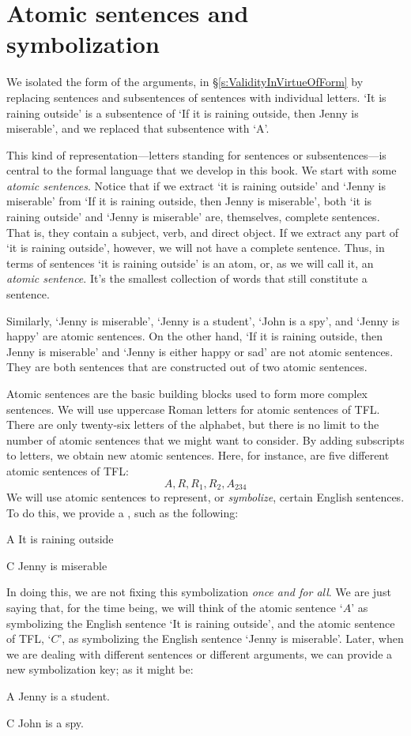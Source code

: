 \section{Atomic sentences and symbolization}

We isolated the form of the arguments, in \S\ref{s:ValidityInVirtueOfForm} by replacing sentences and subsentences of sentences with individual letters. `It is raining outside' is a subsentence of `If it is raining outside, then Jenny is miserable', and we replaced that subsentence with `A'. 

This kind of representation---letters standing for sentences or subsentences---is central to the formal language that we develop in this book. We start with some \emph{atomic sentences}. Notice that if we extract `it is raining outside' and `Jenny is miserable' from `If it is raining outside, then Jenny is miserable', both `it is raining outside' and `Jenny is miserable' are, themselves, complete sentences. That is, they contain a subject, verb, and direct object. If we extract any part of `it is raining outside', however, we will not have a complete sentence. Thus, in terms of sentences `it is raining outside' is an atom, or, as we will call it, an \textit{atomic sentence}. It's the smallest collection of words that still constitute a sentence. 

Similarly, `Jenny is miserable', `Jenny is a student', `John is a spy', and `Jenny is happy' are atomic sentences. On the other hand, `If it is raining outside, then Jenny is miserable' and `Jenny is either happy or sad' are not atomic sentences. They are both sentences that are constructed out of two atomic sentences.

Atomic sentences are the basic building blocks used to form more complex sentences. We will use uppercase Roman letters for atomic sentences of TFL. There are only twenty-six letters of the alphabet, but there is no limit to the number of atomic sentences that we might want to consider. By adding subscripts to letters, we obtain new atomic sentences. Here, for instance, are five different atomic sentences of TFL:
	$$A, R, R_1, R_2, A_{234}$$
We will use atomic sentences to represent, or \emph{symbolize}, certain English sentences. To do this, we provide a , such as the following:
	\begin{ekey}
		\item[A] It is raining outside
		\item[C] Jenny is miserable
	\end{ekey}
In doing this, we are not fixing this symbolization \emph{once and for all}. We are just saying that, for the time being, we will think of the atomic sentence `$A$' as symbolizing the English sentence `It is raining outside', and the atomic sentence of TFL, `$C$', as symbolizing the English sentence `Jenny is miserable'. Later, when we are dealing with different sentences or different arguments, we can provide a new symbolization key; as it might be:
	\begin{ekey}
		\item[A] Jenny is a student.
		\item[C] John is a spy.
	\end{ekey}



